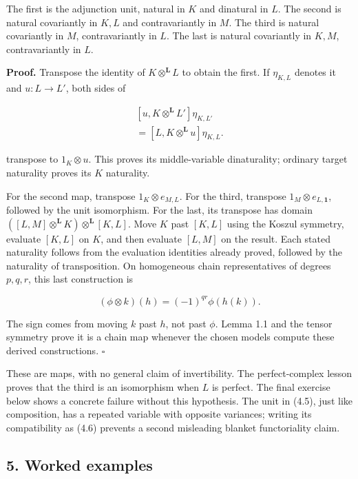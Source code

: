 \documentclass[
  english,
  11pt,
  a4paper,
]{article}
\begin{document}
The first is the adjunction unit, natural in \(K\) and dinatural in
\(L\). The second is natural covariantly in \(K,L\) and contravariantly
in \(M\). The third is natural covariantly in \(M\), contravariantly in
\(L\). The last is natural covariantly in \(K,M\), contravariantly in
\(L\).

\textbf{Proof.} Transpose the identity of \(K\otimes^{\mathbf L}L\) to
obtain the first. If \(\eta_{K,L}\) denotes it and \(u:L\to L'\), both
sides of

\[\begin{gathered}
{}[u,K\otimes^{\mathbf L}L']\eta_{K,L'}\\
=[L,K\otimes^{\mathbf L}u]\eta_{K,L}.
\end{gathered}
\tag{4.6}\]

transpose to \(1_K\otimes u\). This proves its middle-variable
dinaturality; ordinary target naturality proves its \(K\) naturality.

For the second map, transpose \(1_K\otimes e_{M,L}\). For the third,
transpose \(1_M\otimes e_{L,\mathbf1}\), followed by the unit
isomorphism. For the last, its transpose has domain
\(([L,M]\otimes^{\mathbf L}K)\otimes^{\mathbf L}[K,L]\). Move \(K\) past
\([K,L]\) using the Koszul symmetry, evaluate \([K,L]\) on \(K\), and
then evaluate \([L,M]\) on the result. Each stated naturality follows
from the evaluation identities already proved, followed by the
naturality of transposition. On homogeneous chain representatives of
degrees \(p,q,r\), this last construction is

\[(\phi\otimes k)(h)=(-1)^{qr}\phi(h(k)).
\tag{4.7}\]

The sign comes from moving \(k\) past \(h\), not past \(\phi\). Lemma
1.1 and the tensor symmetry prove it is a chain map whenever the chosen
models compute these derived constructions. \(\square\)

These are maps, with no general claim of invertibility. The
perfect-complex lesson proves that the third is an isomorphism when
\(L\) is perfect. The final exercise below shows a concrete failure
without this hypothesis. The unit in (4.5), just like composition, has a
repeated variable with opposite variances; writing its compatibility as
(4.6) prevents a second misleading blanket functoriality claim.

\subsection{5. Worked
examples}\label{internal-derived-hom-and-ext-sheaves--5-worked-examples}
\end{document}
